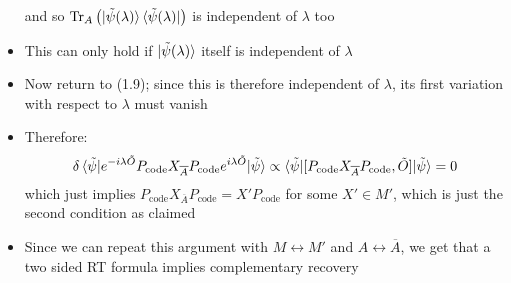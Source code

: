 \documentclass[12pt,a4paper]{article}
\numberwithin{equation}{section}
\newcommand{\ketbra}[2]{\ket{#1}\bra{#2}}
\newcommand{\ketbras}[1]{\ketbra{#1}{#1}}
\newcommand{\Pc}{P_{\text{code}}}
\newcommand{\ol}[1]{\overline{#1}}
\theoremstyle{definition}
\theoremstyle{theorem}
\theoremstyle{example}
\begin{document}
\begin{itemize}
\begin{equation}
		\end{equation}
		and so $\text{Tr}_{A}\left(\ketbras{\tilde{\psi}(\lambda)}\right)$ is independent of $\lambda$ too
		\item This can only hold if $\ket{\tilde{\psi}(\lambda)}$ itself is independent of $\lambda$
		\item Now return to (1.9); since this is therefore independent of $\lambda$, its first variation with respect to $\lambda$ must vanish
		\item Therefore:
		\begin{equation}
			\delta\braket{\tilde{\psi}|e^{-i\lambda\tilde{O}}\Pc X_{\ol{A}}\Pc e^{i\lambda\tilde{O}}|\tilde{\psi}}\propto\braket{\tilde{\psi}|[\Pc X_{\ol{A}}\Pc,\tilde{O}]|\tilde{\psi}}=0
		\end{equation}
		which just implies $\Pc X_{\ol{A}}\Pc =X'\Pc$ for some $X'\in M'$, which is just the second condition as claimed
		\item Since we can repeat this argument with $M\leftrightarrow M'$ and $A\leftrightarrow \ol{A}$, we get that a two sided RT formula implies complementary recovery
	\end{itemize}
\end{document}
